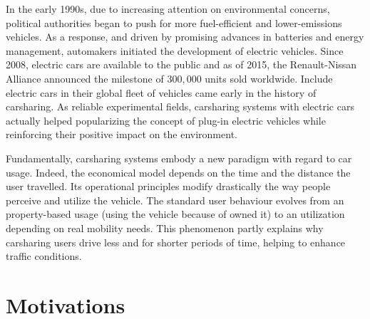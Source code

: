 \begin{bibunit}[ieeetr]
In the early 1990s, due to increasing attention on environmental concerns, political authorities began to push for more fuel-efficient and lower-emissions vehicles.
As a response, and driven by promising advances in batteries and energy management, automakers initiated the development of electric vehicles.
Since 2008, electric cars are available to the public and as of 2015, the Renault-Nissan Alliance announced the milestone of $300,000$ units sold worldwide.
Include electric cars in their global fleet of vehicles came early in the history of carsharing.
As reliable experimental fields, carsharing systems with electric cars actually helped popularizing the concept of plug-in electric vehicles while reinforcing their positive impact on the environment.

\medskip
Fundamentally, carsharing systems embody a new paradigm with regard to car usage.
Indeed, the economical model depends on the time and the distance the user travelled.
Its operational principles modify drastically the way people perceive and utilize the vehicle.
The standard user behaviour evolves from an property-based usage (\ie using the vehicle because of owned it) to an utilization depending on real mobility needs.
This phenomenon partly explains why carsharing users drive less and for shorter periods of time, helping to enhance traffic conditions.





\section{Motivations}


\end{bibunit}
